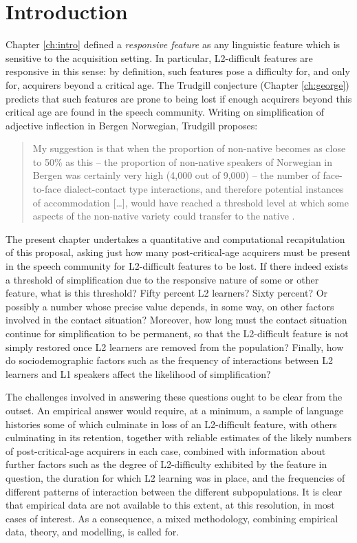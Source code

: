\hypertarget{sec:introduction}{%
\section{Introduction}\label{sec:introduction}}

Chapter \ref{ch:intro} defined a \emph{responsive feature} as any
linguistic feature which is sensitive to the acquisition setting. In
particular, L2-difficult features are responsive in this sense: by
definition, such features pose a difficulty for, and only for, acquirers
beyond a critical age. The Trudgill conjecture (Chapter \ref{ch:george})
predicts that such features are prone to being lost if enough acquirers
beyond this critical age are found in the speech community. Writing on
simplification of adjective inflection in Bergen Norwegian, Trudgill
proposes:

\begin{quote}
My suggestion is that when the proportion of non-native becomes as close
to 50\% as this -- the proportion of non-native speakers of Norwegian in
Bergen was certainly very high (4,000 out of 9,000) -- the number of
face-to-face dialect-contact type interactions, and therefore potential
instances of accommodation {[}\ldots{]}, would have reached a threshold
level at which some aspects of the non-native variety could transfer to
the native \autocite[pp.~57--58]{Tru2011}.
\end{quote}

The present chapter undertakes a quantitative and computational
recapitulation of this proposal, asking just how many post-critical-age
acquirers must be present in the speech community for L2-difficult
features to be lost. If there indeed exists a threshold of
simplification due to the responsive nature of some or other feature,
what is this threshold? Fifty percent L2 learners? Sixty percent? Or
possibly a number whose precise value depends, in some way, on other
factors involved in the contact situation? Moreover, how long must the
contact situation continue for simplification to be permanent, so that
the L2-difficult feature is not simply restored once L2 learners are
removed from the population? Finally, how do sociodemographic factors
such as the frequency of interactions between L2 learners and L1
speakers affect the likelihood of simplification?

The challenges involved in answering these questions ought to be clear
from the outset. An empirical answer would require, at a minimum, a
sample of language histories some of which culminate in loss of an
L2-difficult feature, with others culminating in its retention, together
with reliable estimates of the likely numbers of post-critical-age
acquirers in each case, combined with information about further factors
such as the degree of L2-difficulty exhibited by the feature in
question, the duration for which L2 learning was in place, and the
frequencies of different patterns of interaction between the different
subpopulations. It is clear that empirical data are not available to
this extent, at this resolution, in most cases of interest. As a
consequence, a mixed methodology, combining empirical data, theory, and
modelling, is called for.


